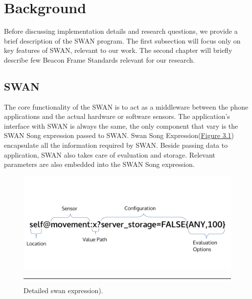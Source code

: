 
\chapter{Background} %

\label{Chapter3} %


Before discussing implementation details and research questions, we provide a brief description of the SWAN program.
The first subsection will focus only on key features of SWAN, relevant to our work.
The second chapter will briefly describe few Beacon Frame Standards relevant for our research.

\section{SWAN}
The core functionality of the SWAN is to act as a middleware between the phone applications and the actual hardware or software sensors.
The application's interface with SWAN is always the same, the only component that vary is the SWAN Song expression passed to SWAN.
Swan Song Expression(\hyperref[fig:SwanExpression]{Figure 3.1}) encapsulate all the information required by SWAN.
Beside passing data to application, SWAN also takes care of evaluation and storage. Relevant parameters are also embedded into the 
SWAN Song expression.

\begin{figure}[htbp]
  \centering
    \includegraphics[scale=0.6]{Figures/swan_expr.pdf}
    \rule{35em}{0.5pt}
  \caption[Swan Expression]{Detailed swan expression).}
  \label{fig:SwanExpression}
\end{figure}

